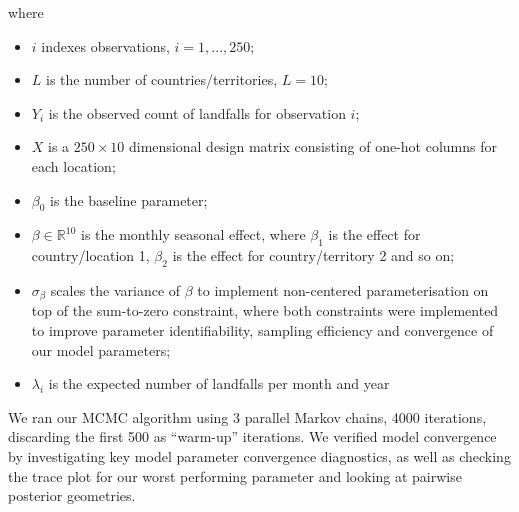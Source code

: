 \documentclass[
]{article}
\providecommand{\tightlist}{%
  \setlength{\itemsep}{0pt}\setlength{\parskip}{0pt}}
\begin{document}
where

\begin{itemize}
\tightlist
\item
  \(i\) indexes observations, \(i=1,...,250\);
\item
  \(L\) is the number of countries/territories, \(L=10\);
\item
  \(Y_{i}\) is the observed count of landfalls for observation \(i\);
\item
  \(X\) is a \(250 \times 10\) dimensional design matrix consisting of one-hot columns for each location;
\item
  \(\beta_0\) is the baseline parameter;
\item
  \(\beta \in \mathbb{R}^{10}\) is the monthly seasonal effect, where \(\beta_1\) is the effect for country/location 1, \(\beta_2\) is the effect for country/territory 2 and so on;
\item
  \(\sigma_{\beta}\) scales the variance of \(\beta\) to implement non-centered parameterisation on top of the sum-to-zero constraint, where both constraints were implemented to improve parameter identifiability, sampling efficiency and convergence of our model parameters;
\item
  \(\lambda_{i}\) is the expected number of landfalls per month and year
\end{itemize}

We ran our MCMC algorithm using 3 parallel Markov chains, 4000 iterations, discarding the first 500 as ``warm-up'' iterations. We verified model convergence by investigating key model parameter convergence diagnostics, as well as checking the trace plot for our worst performing parameter and looking at pairwise posterior geometries.
\end{document}
